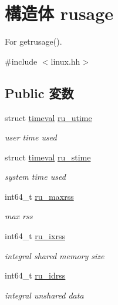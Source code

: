 \hypertarget{structArmLinux64_1_1rusage}{
\section{構造体 rusage}
\label{structArmLinux64_1_1rusage}
}


For getrusage().  


{\ttfamily \#include $<$linux.hh$>$}\subsection*{Public 変数}
\begin{DoxyCompactItemize}
\item 
struct \hyperlink{structArmLinux64_1_1timeval}{timeval} \hyperlink{structArmLinux64_1_1rusage_a40e27c5d4340b0c6532787d6740b22ab}{ru\_\-utime}
\begin{DoxyCompactList}\small\item\em user time used \item\end{DoxyCompactList}\item 
struct \hyperlink{structArmLinux64_1_1timeval}{timeval} \hyperlink{structArmLinux64_1_1rusage_a15f836efd7b69c0a0eb19f5d9505e3e9}{ru\_\-stime}
\begin{DoxyCompactList}\small\item\em system time used \item\end{DoxyCompactList}\item 
int64\_\-t \hyperlink{structArmLinux64_1_1rusage_a67b085d370d7a42fec998a14f6ea1eab}{ru\_\-maxrss}
\begin{DoxyCompactList}\small\item\em max rss \item\end{DoxyCompactList}\item 
int64\_\-t \hyperlink{structArmLinux64_1_1rusage_a13da5e5855b52e8b43ecd6c6d671708e}{ru\_\-ixrss}
\begin{DoxyCompactList}\small\item\em integral shared memory size \item\end{DoxyCompactList}\item 
int64\_\-t \hyperlink{structArmLinux64_1_1rusage_a957d4290597d297f4fe76a7136182b75}{ru\_\-idrss}
\begin{DoxyCompactList}\small\item\em integral unshared data  \item\end{DoxyCompactList}\item 

\end{DoxyCompactItemize}
